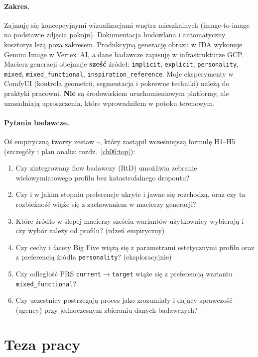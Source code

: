 \paragraph{Zakres.}
Zajmuję się koncepcyjnymi wizualizacjami wnętrz mieszkalnych (image-to-image na podstawie zdjęcia pokoju). Dokumentacja budowlana i automatyczny kosztorys leżą poza zakresem.
Produkcyjną generację obrazu w IDA wykonuje Gemini Image w Vertex~AI, a dane badawcze zapisuję w infrastrukturze GCP.
Macierz generacji obejmuje \textbf{sześć} źródeł: \texttt{implicit}, \texttt{explicit}, \texttt{personality}, \texttt{mixed}, \texttt{mixed\_functional}, \texttt{inspiration\_reference}.
Moje eksperymenty w ComfyUI (kontrola geometrii, segmentacja i pokrewne techniki) należą do praktyki pracowni. \textbf{Nie} są środowiskiem uruchomieniowym platformy, ale uzasadniają uproszczenia, które wprowadziłem w potoku terenowym.

\paragraph{Pytania badawcze.}
Oś empiryczną tworzy zestaw --, który zastąpił wcześniejszą formułę H1--H5 (szczegóły i plan analiz: rozdz.~\ref{ch06:top}):
\begin{enumerate}
  \item[\RQ{1}] Czy zintegrowany flow badawczy (RtD) umożliwia zebranie wielowymiarowego profilu bez katastrofalnego dropoutu?
  \item[\RQ{2}] Czy i w jakim stopniu preferencje ukryte i jawne się rozchodzą, oraz czy ta rozbieżność wiąże się z zachowaniem w macierzy generacji?
  \item[\RQ{3}] Które źródło w ślepej macierzy sześciu wariantów użytkownicy wybierają i czy wybór zależy od profilu? (rdzeń empiryczny)
  \item[\RQ{4}] Czy cechy i facety Big Five wiążą się z parametrami estetycznymi profilu oraz z preferencją źródła \texttt{personality}? (eksploracyjnie)
  \item[\RQ{5}] Czy odległość PRS \texttt{current}$\rightarrow$\texttt{target} wiąże się z preferencją wariantu \texttt{mixed\_functional}?
  \item[\RQ{6}] Czy uczestnicy postrzegają proces jako zrozumiały i dający sprawczość (agency) przy jednoczesnym zbieraniu danych badawczych?
\end{enumerate}

\section{Teza pracy}
\label{ch01:sec:teza}

